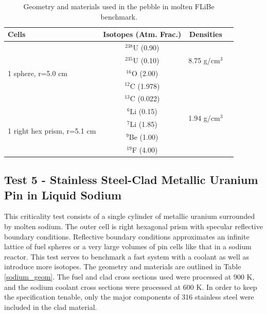 \documentclass[preprint,12pt]{elsarticle}
\begin{document}
\begin{table}[h]
\centering
\caption{Geometry and materials used in the pebble in molten FLiBe benchmark.}
\label{pebble_geom}
\begin{tabular}{| l | c | c | c |}
\hline
Cells & Isotopes (Atm. Frac.)& Densities \\
\hline
\multirow{5}{*}{1 sphere, r=5.0 cm }  &   $^{238}$U   (0.90) &    \multirow{3}{*}{8.75 g/cm$^3$} \\
                                     &   $^{235}$U   (0.10) & \\
                                     &   $^{16}$O    (2.00) & \\
                                     &   $^{12}$C    (1.978)& \\
                                     &   $^{13}$C    (0.022)& \\
\hline
\multirow{4}{*}{1 right hex prism, r=5.1 cm }  &   $^{6}$Li  (0.15) &    \multirow{2}{*}{1.94 g/cm$^3$} \\
                                               &  $^{7}$Li  (1.85)& \\
                                               &  $^{9}$Be  (1.00) & \\
                                               &  $^{19}$F  (4.00) & \\
\hline
\end{tabular}
\end{table}

\subsection{Test 5 - Stainless Steel-Clad Metallic Uranium Pin in Liquid Sodium}

This criticality test consists of a single cylinder of metallic uranium surrounded by molten sodium.  The outer cell is right hexagonal prism with specular reflective boundary conditions.  Reflective boundary conditions approximates an infinite lattice of fuel spheres or a very large volumes of  pin cells like that in a sodium reactor.  This test serves to benchmark a fast system with a coolant as well as introduce more isotopes.  The geometry and materials are outlined in Table \ref{sodium_geom}.  The fuel and clad cross sections used were processed at 900 K, and the sodium coolant cross sections were processed at 600 K.  In order to keep the specification tenable, only the major components of 316 stainless steel were included in the clad material. 
\end{document}
